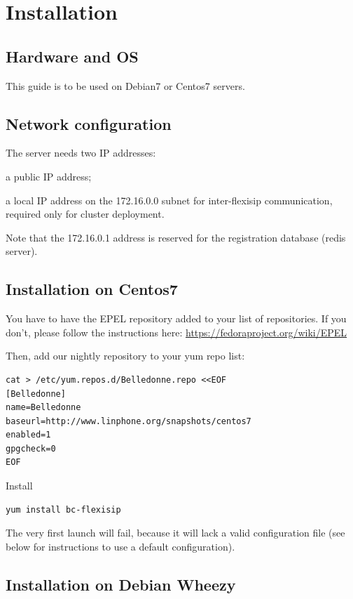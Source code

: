 \documentclass[a4paper,10pt]{article}
\begin{document}
\section{Installation}
\subsection{Hardware and OS}
This guide is to be used on Debian7 or Centos7 servers.

\subsection{Network configuration}
The server needs two IP addresses:
\begin{itemize*}
 \item a public IP address;
 \item a local IP address on the 172.16.0.0 subnet for inter-flexisip communication, required only for cluster deployment.
\end{itemize*}

Note that the 172.16.0.1 address is reserved for the registration database (redis server).


\subsection{Installation on Centos7}

You have to have the EPEL repository added to your list of repositories. If you don't, please follow the instructions here: \url{https://fedoraproject.org/wiki/EPEL}


Then, add our nightly repository to your yum repo list:

\begin{verbatim}
cat > /etc/yum.repos.d/Belledonne.repo <<EOF
[Belledonne]
name=Belledonne
baseurl=http://www.linphone.org/snapshots/centos7
enabled=1
gpgcheck=0
EOF
\end{verbatim}

Install
\begin{verbatim}
yum install bc-flexisip
\end{verbatim}

The very first launch will fail, because it will lack a valid configuration file (see below for instructions to use a default configuration).


\subsection{Installation on Debian Wheezy}
\end{document}
